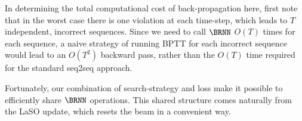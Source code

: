 In determining the total computational cost of back-propagation here, first note that in the worst case there is one violation at each time-step, which
leads to $T$ independent, incorrect sequences. Since we need to call $\BRNN$
$O(T)$ times for each sequence, a naive strategy of running BPTT for each incorrect sequence would lead to an $O(T^2)$ backward pass, rather than the $O(T)$ time required for the standard seq2seq approach. 

Fortunately, our combination of search-strategy and loss make it
possible to efficiently share $\BRNN$ operations. This shared
structure comes naturally from the LaSO update, which resets the beam in a convenient way. 






